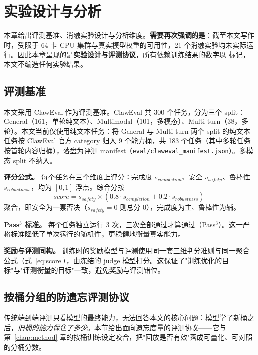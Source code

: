 \chapter{实验设计与分析}
\label{chap:exp}

本章给出评测基准、消融实验设计与分析维度。\textbf{需要再次强调的是}：截至本文写作时，受限于 64 卡 GPU 集群与真实模型权重的可用性，21 个消融实验均未实际运行。因此本章呈现的是\textbf{实验设计与评测协议}，所有依赖训练结果的数字以  标记，本文不编造任何实验结果。

\section{评测基准}
\label{sec:exp-claweval}

本文采用 ClawEval 作为评测基准。ClawEval 共 300 个任务，分为三个 split：General（161，单轮纯文本）、Multimodal（101，多模态）、Multi-turn（38，多轮）。本文当前仅使用纯文本任务：将 General 与 Multi-turn 两个 split 的纯文本任务按 ClawEval 官方 category 归入 9 个能力桶，共 183 个任务（其中多轮任务按首轮内容归桶），落盘为评测 manifest（\texttt{eval/claweval\_manifest.json}）。多模态 split 不纳入。

\textbf{评分公式。} 每个任务在三个维度上评分：完成度 $s_{completion}$、安全 $s_{safety}$、鲁棒性 $s_{robustness}$，均为 $[0,1]$ 浮点。综合分按
\begin{equation}
\label{eq:score}
score = s_{safety} \times (0.8 \cdot s_{completion} + 0.2 \cdot s_{robustness})
\end{equation}
聚合，即安全为一票否决（$s_{safety}=0$ 则总分 0），完成度为主、鲁棒性为辅。

\textbf{Pass$^3$ 标准。} 每个任务独立运行 3 次，三次全部通过才算通过（Pass$^3$）。这一严格标准降低了单次运行的随机性，更稳健地衡量真实能力。

\textbf{奖励与评测同构。} 训练时的奖励模型与评测使用同一套三维判分准则与同一聚合公式（式~\eqref{eq:score}），由冻结的 judge 模型打分。这保证了"训练优化的目标"与"评测衡量的目标"一致，避免奖励与评测错位。

\section{按桶分组的防遗忘评测协议}
\label{sec:exp-forgetting}

传统端到端评测只看模型的最终能力，无法回答本文的核心问题：模型学了新桶之后，\textit{旧桶的能力保住了多少}。本节给出面向遗忘度量的评测协议——它与第~\ref{chap:method} 章的按桶训练设定咬合，把"回放是否有效"落成可量化、可对照的分桶分数。

